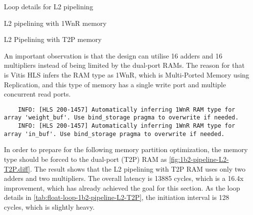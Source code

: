 
\begin{table}[ht!]

    \caption{Loop details for L2 pipelining}

    \begin{subtable}{\textwidth}
        \caption{L2 pipelining with 1WnR memory}
        \label{tab:float-loop-1b2-pipeline-L2-1WnR}
        \centering
        
    \end{subtable}

    \begin{subtable}{\textwidth}
        \caption{L2 Pipelining with T2P memory}
        \label{tab:float-loop-1b2-pipeline-L2-T2P}
        \centering
        
    \end{subtable}

\end{table}

An important observation is that the design can utilise 16 adders and 16 multipliers instead of being limited by the dual-port RAMs.
The reason for that is Vitis HLS infers the RAM type as 1WnR, which is Multi-Ported Memory using Replication, and this type of memory has a single write port and multiple concurrent read ports.
\begin{verbatim}
    INFO: [HLS 200-1457] Automatically inferring 1WnR RAM type for array 'weight_buf'. Use bind_storage pragma to overwrite if needed.
    INFO: [HLS 200-1457] Automatically inferring 1WnR RAM type for array 'in_buf'. Use bind_storage pragma to overwrite if needed.
\end{verbatim}

In order to prepare for the following memory partition optimization, the memory type should be forced to the dual-port (T2P) RAM as \autoref{fig:1b2-pipeline-L2-T2P.diff}.
The result shows that the L2 pipelining with T2P RAM uses only two adders and two multipliers.
The overall latency is 13885 cycles, which is a 16.4x improvement, which has already achieved the goal for this section.
As the loop details in \autoref{tab:float-loop-1b2-pipeline-L2-T2P}, the initiation interval is 128 cycles, which is slightly heavy.

